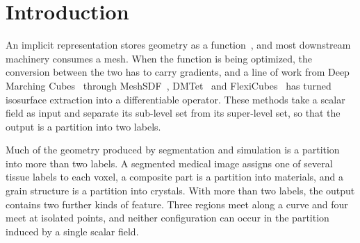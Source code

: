 \documentclass{egpubl}
\theoremstyle{definition}
\begin{document}
\begin{abstract}

\printccsdesc
\end{abstract}


\section{Introduction}
\label{sec:intro}

An implicit representation stores geometry as a function~\cite{park2019,
mescheder2019}, and most downstream machinery consumes a mesh. When the
function is being optimized, the conversion between the two has to carry
gradients, and a line of work from Deep Marching Cubes~\cite{liao2018} through
MeshSDF~\cite{remelli2020}, DMTet~\cite{shen2021} and FlexiCubes~\cite{shen2023}
has turned isosurface extraction into a differentiable operator. These methods
take a scalar field as input and separate its sub-level set from its
super-level set, so that the output is a partition into two labels.

Much of the geometry produced by segmentation and simulation is a
partition into more than two labels. A segmented medical image assigns one of
several tissue labels to each voxel, a composite part is a partition into
materials, and a grain structure is a partition into crystals. With more than
two labels, the output contains two further kinds of feature. Three regions
meet along a curve and four meet at isolated points, and neither configuration
can occur in the partition induced by a single scalar field.
\end{document}
